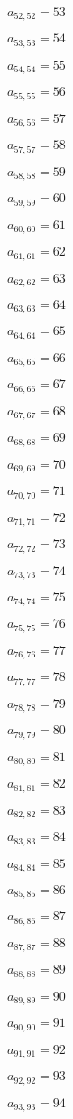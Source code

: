 \documentclass[a4paper,12pt]{article}
\begin{document}
$a _{ 52, 52 } = 53$

$a _{ 53, 53 } = 54$

$a _{ 54, 54 } = 55$

$a _{ 55, 55 } = 56$

$a _{ 56, 56 } = 57$

$a _{ 57, 57 } = 58$

$a _{ 58, 58 } = 59$

$a _{ 59, 59 } = 60$

$a _{ 60, 60 } = 61$

$a _{ 61, 61 } = 62$

$a _{ 62, 62 } = 63$

$a _{ 63, 63 } = 64$

$a _{ 64, 64 } = 65$

$a _{ 65, 65 } = 66$

$a _{ 66, 66 } = 67$

$a _{ 67, 67 } = 68$

$a _{ 68, 68 } = 69$

$a _{ 69, 69 } = 70$

$a _{ 70, 70 } = 71$

$a _{ 71, 71 } = 72$

$a _{ 72, 72 } = 73$

$a _{ 73, 73 } = 74$

$a _{ 74, 74 } = 75$

$a _{ 75, 75 } = 76$

$a _{ 76, 76 } = 77$

$a _{ 77, 77 } = 78$

$a _{ 78, 78 } = 79$

$a _{ 79, 79 } = 80$

$a _{ 80, 80 } = 81$

$a _{ 81, 81 } = 82$

$a _{ 82, 82 } = 83$

$a _{ 83, 83 } = 84$

$a _{ 84, 84 } = 85$

$a _{ 85, 85 } = 86$

$a _{ 86, 86 } = 87$

$a _{ 87, 87 } = 88$

$a _{ 88, 88 } = 89$

$a _{ 89, 89 } = 90$

$a _{ 90, 90 } = 91$

$a _{ 91, 91 } = 92$

$a _{ 92, 92 } = 93$

$a _{ 93, 93 } = 94$
\end{document}
